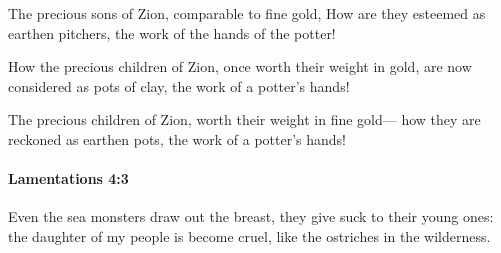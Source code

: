 			\begin{versebox}
					\item[BHS] 
					\item[LXX] 
					\item[ASV] The precious sons of Zion, comparable to fine gold, How are they esteemed as earthen pitchers, the work of the hands of the potter!
					\item[NIV] How the precious children of Zion, once worth their weight in gold, are now considered as pots of clay, the work of a potter’s hands!
					\item[NRSV] The precious children of Zion, worth their weight in fine gold— how they are reckoned as earthen pots, the work of a potter’s hands!
			\end{versebox}

		\paragraph{Lamentations 4:3} %
			\label{LAMENTATIONS-4-3}

			Even the sea monsters draw out the breast, they give suck to their young ones: the daughter of my people is become cruel, like the ostriches in the wilderness.

